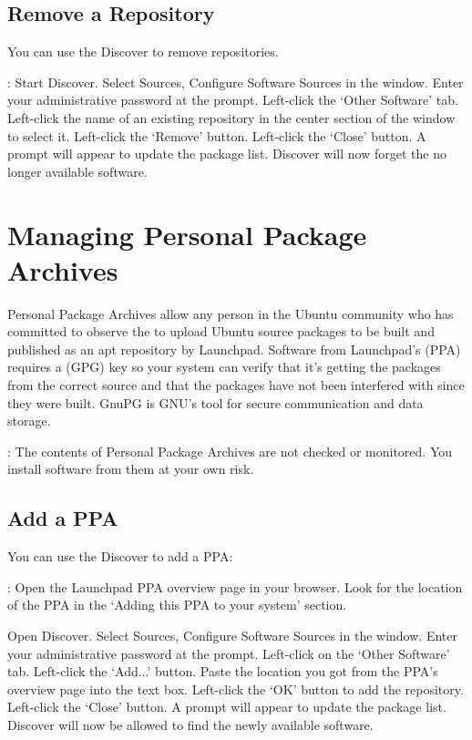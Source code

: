 \documentclass[letterpaper,10pt,english]{sphinxmanual}
\begin{document}
\subsection{Remove a Repository}
\label{\detokenize{docs/repositories:remove-a-repository}}
You can use the Discover to remove repositories.

: Start Discover. Select Sources, Configure Software Sources in the window. Enter your administrative password at the prompt. Left-click the `Other Software' tab. Left-click the name of an existing repository in the center section of the window to select it. Left-click the `Remove' button. Left-click the `Close' button. A prompt will appear to update the package list. Discover will now forget the no longer available software.


\section{Managing Personal Package Archives}
\label{\detokenize{docs/repositories:managing-personal-package-archives}}
Personal Package Archives allow any person in the Ubuntu community who has committed to observe the  to upload Ubuntu source packages to be built and published as an apt repository by Launchpad. Software from Launchpad's  (PPA) requires a  (GPG) key so your system can verify that it's getting the packages from the correct source and that the packages have not been interfered with since they were built. GnuPG is GNU's tool for secure communication and data storage.

: The contents of Personal Package Archives are not checked or monitored. You install software from them at your own risk.


\subsection{Add a PPA}
\label{\detokenize{docs/repositories:add-a-ppa}}
You can use the Discover to add a PPA:

: Open the Launchpad PPA overview page in your browser. Look for the location of the PPA in the `Adding this PPA to your system' section.

Open Discover. Select Sources, Configure Software Sources in the window. Enter your administrative password at the prompt. Left-click on the `Other Software' tab. Left-click the `Add...' button. Paste the location you got from the PPA's overview page into the text box. Left-click the `OK' button to add the repository. Left-click the `Close' button. A prompt will appear to update the package list. Discover will now be allowed to find the newly available software.
\end{document}
